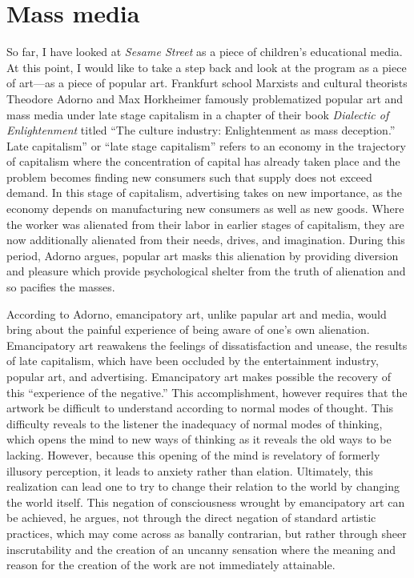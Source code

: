 \documentclass[12pt,letterpaper]{article}
\newcommand{\ses}{\textit{Sesame Street }}
\begin{document}
	\section*{Mass media}

	So far, I have looked at \ses as a piece of 
	children's educational media. At this point, I would like to take 
	a step back and look at the program as a piece of art---as a piece of
	popular art. Frankfurt school Marxists and cultural theorists Theodore 
	Adorno and Max Horkheimer famously problematized popular art and mass 
	media under late stage capitalism in a chapter of their book 
	\textit{Dialectic of Enlightenment} titled ``The culture industry: 
	Enlightenment as mass deception.''\autocite{Adorno} Late capitalism'' 
	or ``late stage capitalism'' 
	refers to an economy in the trajectory of capitalism where the 
	concentration of capital has already taken place and the problem 
	becomes finding new consumers such that supply does not exceed demand. 
	In this stage of capitalism, advertising takes on new importance, as
	the economy depends on manufacturing new consumers as well as new 
	goods.\autocite[66]{Baugh}
	Where the worker was alienated from their labor in earlier stages of 
	capitalism, they are now additionally
	alienated from their needs, drives, and imagination.\autocite[66]{Baugh}
	During this period, Adorno argues, popular art masks this alienation 
	by providing diversion and pleasure which provide psychological shelter
	from the truth of alienation and so pacifies the
	masses.\autocite[67]{Baugh}

	According to Adorno, emancipatory art, unlike papular art and media, 
	would bring about the painful experience of being aware of one's own 
	alienation. Emancipatory art reawakens the feelings of dissatisfaction 
	and unease, the results of late capitalism, which have been occluded by
	the entertainment industry, popular art, and advertising. Emancipatory 
	art makes possible the recovery of this ``experience of the negative.''
	This accomplishment, however requires that the artwork be difficult to 
	understand according to normal modes of thought. This difficulty reveals
	to the listener the inadequacy of normal modes of thinking, which opens 
	the mind to new ways of thinking as it reveals the old ways to be 
	lacking. However, because this opening of the mind is revelatory of 
	formerly illusory perception, it leads to anxiety rather than elation. 
	Ultimately, this realization can lead one to try to change their 
	relation to the world by changing the world 
	itself.\autocite[67--69]{Baugh}    
	This negation of consciousness wrought by emancipatory art can be 
	achieved, he argues, not through the direct negation of standard 
	artistic practices, which may come across as banally contrarian, but 
	rather through sheer inscrutability and the creation of an uncanny 
	sensation where the meaning and reason for the creation of the work are
	not immediately attainable.\autocite[71]{Baugh}
	
\end{document}

